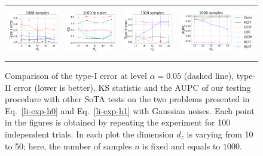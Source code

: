 \begin{figure}[ht]
\begin{tabular}{cccc} 
\includegraphics[height=2.2cm]{sections/appendix/independence_testing_kernel/figures_li_highdim/nsamples_fixed_1000_li_dim_10_50_typeI.pdf}& \includegraphics[height=2.2cm]{sections/appendix/independence_testing_kernel/figures_li_highdim/nsamples_fixed_1000_li_dim_10_50_ks.pdf} & 
\includegraphics[height=2.2cm]{sections/appendix/independence_testing_kernel/figures_li_highdim/nsamples_fixed_1000_li_dim_10_50_typeII.pdf}& \includegraphics[height=2.2cm]{sections/appendix/independence_testing_kernel/figures_li_highdim/nsamples_fixed_1000_li_dim_10_50_aupc.pdf}
\end{tabular}
\caption{Comparison of the type-I error at level $\alpha=0.05$ (dashed line), type-II error (lower is better), KS statistic and the AUPC of our testing procedure with other SoTA tests on the two problems presented in Eq.~\eqref{li-exp-h0} and Eq.~\eqref{li-exp-h1} with Gaussian noises. Each point in the figures is obtained by repeating the experiment for 100 independent trials. In each plot the dimension $d_z$ is varying from 10 to 50; here, the number of samples $n$ is fixed and equals to $1000$. 
\label{fig-exp-li-highdim-gauss-supp}}
\vspace{-0.8cm}
\end{figure}


\newpage
